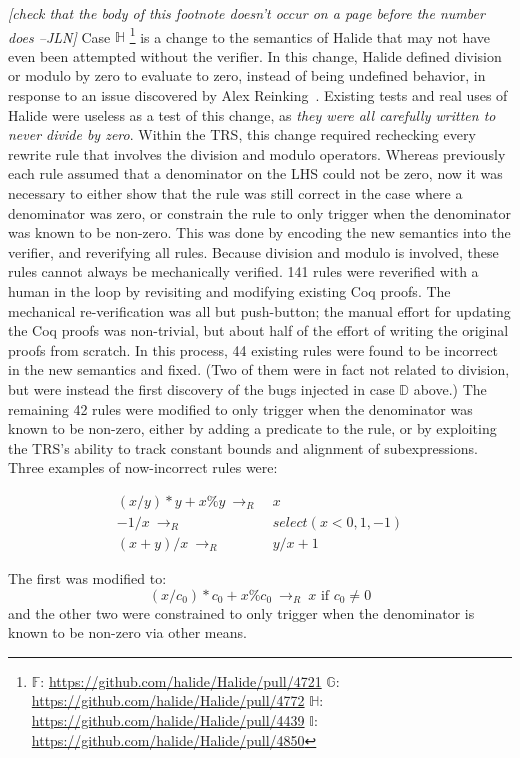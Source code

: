 \documentclass[acmsmall,review]{acmart}\settopmatter{printfolios=true,printccs=false,printacmref=false}
\newcommand{\jln}[1]{\textcolor{uwpurple}{\textit{[{#1} --JLN]}}}
\newcommand{\rewrites}[0]{\:\rightarrow_{R}\:}
\newcommand{\pred}[0]{\textrm{ if }}
\begin{document}
\jln{check that the body of this footnote doesn't occur on a page before the number does}
Case $\mathbb{H}$
\footnote{
\label{footnote:casesfi}
$\mathbb{F}$: \url{https://github.com/halide/Halide/pull/4721}
$\mathbb{G}$: \url{https://github.com/halide/Halide/pull/4772}
$\mathbb{H}$: \url{https://github.com/halide/Halide/pull/4439}
$\mathbb{I}$: \url{https://github.com/halide/Halide/pull/4850}
}
is a change to the semantics of Halide that may not have even been attempted without the verifier. In this change, Halide defined division or modulo by zero to evaluate to zero, instead of being undefined behavior, in response to an issue discovered by Alex Reinking~\cite{reinkingthesis}. Existing tests and real uses of Halide were useless as a test of this change, as \emph{they were all carefully written to never divide by zero}. Within the TRS, this change required rechecking every rewrite rule that involves the division and modulo operators. Whereas previously each rule assumed that a denominator on the LHS could not be zero, now it was necessary to either show that the rule was still correct in the case where a denominator was zero, or constrain the rule to only trigger when the denominator was known to be non-zero. This was done by encoding the new semantics into the verifier, and reverifying all rules. Because division and modulo is involved, these rules cannot always be mechanically verified. 141 rules were reverified with a human in the loop by revisiting and modifying existing Coq proofs. The mechanical re-verification was all but push-button; the manual effort for updating the Coq proofs was non-trivial, but about half of the effort of writing the original proofs from scratch. In this process, 44 existing rules were found to be incorrect in the new semantics and fixed. (Two of them were in fact not related to division, but were instead the first discovery of the bugs injected in case $\mathbb{D}$ above.) The remaining 42 rules were modified to only trigger when the denominator was known to be non-zero, either by adding a predicate to the rule, or by exploiting the TRS’s ability to track constant bounds and alignment of subexpressions. Three examples of now-incorrect rules were:

\begin{align*}
(x/y)*y + x\%y \rewrites & x \\
  -1 / x \rewrites & select(x < 0, 1, -1) \\
(x + y)/x \rewrites & y/x + 1
\end{align*}

The first was modified to:
\[
(x/c_0)*c_0 + x\%c_0 \rewrites x \pred c_0 \neq 0
\]
and the other two were constrained to only trigger when the denominator is known to be non-zero via other means.
\end{document}
